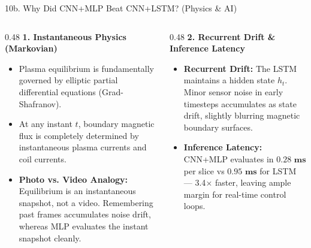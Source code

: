 \documentclass[aspectratio=169, 10pt]{beamer}
\begin{document}
\begin{frame}{10b. Why Did CNN+MLP Beat CNN+LSTM? (Physics \& AI)}
  \begin{columns}[T]
    \begin{column}{0.48\textwidth}
      \textbf{\color{NavyBlue} 1. Instantaneous Physics (Markovian)}
      \begin{itemize}
        \item Plasma equilibrium is fundamentally governed by elliptic partial differential equations (Grad-Shafranov).
        \item At any instant $t$, boundary magnetic flux is completely determined by instantaneous plasma currents and coil currents.
        \item \textbf{Photo vs. Video Analogy:} Equilibrium is an instantaneous snapshot, not a video. Remembering past frames accumulates noise drift, whereas MLP evaluates the instant snapshot cleanly.
      \end{itemize}
    \end{column}

    \begin{column}{0.48\textwidth}
      \textbf{\color{NavyBlue} 2. Recurrent Drift & Inference Latency}
      \begin{itemize}
        \item \textbf{Recurrent Drift:} The LSTM maintains a hidden state $h_t$. Minor sensor noise in early timesteps accumulates as state drift, slightly blurring magnetic boundary surfaces.
        \item \textbf{Inference Latency:} CNN+MLP evaluates in $\mathbf{0.28\text{ ms}}$ per slice vs $\mathbf{0.95\text{ ms}}$ for LSTM --- 3.4$\times$ faster, leaving ample margin for real-time control loops.
      \end{itemize}
    \end{column}
  \end{columns}
\end{frame}
\end{document}
